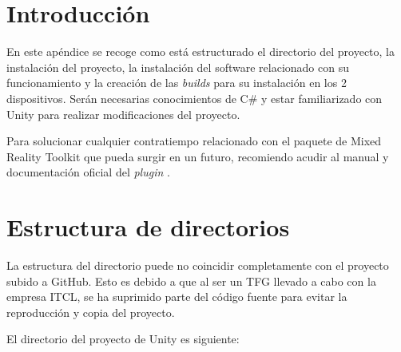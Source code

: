 
\section{Introducción}

En este apéndice se recoge como está estructurado el directorio del proyecto, la instalación del proyecto, la instalación del software relacionado con su funcionamiento y la creación de las \textit{builds} para su instalación en los 2 dispositivos. Serán necesarias conocimientos de C\# y estar familiarizado con Unity para realizar modificaciones del proyecto. 

Para solucionar cualquier contratiempo relacionado con el paquete de Mixed Reality Toolkit que pueda surgir en un futuro, recomiendo acudir al manual y documentación oficial del \textit{plugin} \cite{microsoft:install}.

\section{Estructura de directorios}

La estructura del directorio puede no coincidir completamente con el proyecto subido a GitHub. Esto es debido a que al ser un TFG llevado a cabo con la empresa ITCL, se ha suprimido parte del código fuente para evitar la reproducción y copia del proyecto.

El directorio del proyecto de Unity es siguiente:

